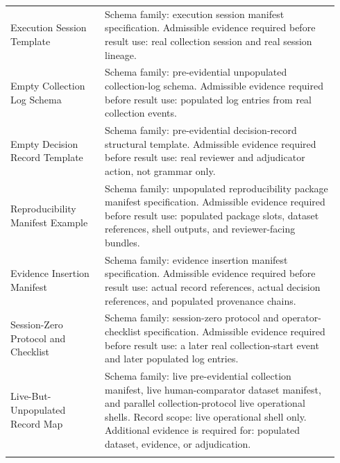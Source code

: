 \documentclass[11pt,a4paper]{article}
\begin{document}
\begin{longtable}{@{}>{\raggedright\arraybackslash}p{0.27\linewidth}p{0.67\linewidth}@{}}
Execution Session Template & Schema family: execution session manifest specification.\newline 
Admissible evidence required before result use: real collection session and
real session lineage. \\ \addlinespace
Empty Collection Log Schema & Schema family: pre-evidential unpopulated collection-log schema.\newline 
Admissible evidence required before result use: populated log entries from real
collection events. \\ \addlinespace
Empty Decision Record Template & Schema family: pre-evidential decision-record structural template.\newline 
Admissible evidence required before result use: real reviewer and adjudicator
action, not grammar only. \\ \addlinespace
Reproducibility Manifest Example & Schema family: unpopulated reproducibility package manifest specification.\newline 
Admissible evidence required before result use: populated package slots,
dataset references, shell outputs, and reviewer-facing bundles. \\ \addlinespace
Evidence Insertion Manifest & Schema family: evidence insertion manifest specification.\newline 
Admissible evidence required before result use: actual record references, actual
decision references, and populated provenance chains. \\ \addlinespace
Session-Zero Protocol and Checklist & Schema family: session-zero protocol and operator-checklist specification.\newline 
Admissible evidence required before result use: a later real collection-start
event and later populated log entries. \\ \addlinespace
Live-But-Unpopulated Record Map & Schema family: live pre-evidential collection manifest, live human-comparator
dataset manifest, and parallel collection-protocol live operational shells.\newline 
Record scope: live operational shell only. Additional evidence is required for:
populated dataset, evidence, or adjudication. \\ \addlinespace
\bottomrule\end{longtable}
\endgroup

\clearpage
\end{document}
